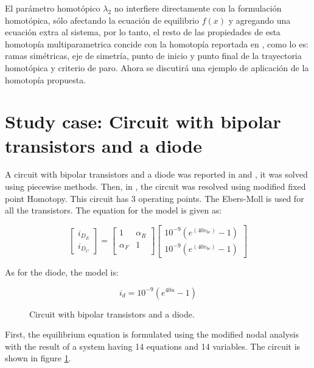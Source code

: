 \documentclass[conference,letterpaper,twocolumn]{IEEEtran}
\begin{document}
El parámetro homotópico $\lambda_2$ no interfiere directamente con la formulación homotópica, sólo afectando la ecuación de equilibrio $f(x)$ y agregando una ecuación extra al sistema, por lo tanto,
el resto de las propiedades de esta homotopía multiparametrica concide con la homotopía reportada en \cite{xxx1}, como lo es: ramas simétricas, eje de simetría, punto de inicio
y punto final de la trayectoria homotópica y criterio de paro. Ahora se discutirá una ejemplo de aplicación de la homotopía propuesta.


\section{Study case: Circuit with bipolar transistors and a diode}


A circuit with bipolar transistors and a diode was reported in \cite{homo_tadeusiewicz} and  \cite{homo_yamamurawise}, it was solved using piecewise methods. Then, in \cite{homo_yamamura}, the circuit was resolved using modified fixed point Homotopy. This circuit has 3 operating points. The Ebers-Moll is used for all the transistors. The equation for the model is given as:

\begin{displaymath}
\left[ \begin{array}{c}
i_{D_E} \\
i_{D_C}
\end{array}\right] =
\left[ \begin{array}{cc} 1  & \alpha_R \\
\alpha_F & 1 \\
\end{array}\right] \left[ \begin{array}{c}
10^{-9}(e^{(40v_{be})} - 1) \\
10^{-9}(e^{(40v_{bc})} - 1)
\end{array}\right]
\end{displaymath}

As for the diode, the model is:

\begin{displaymath}
i_d=10^{-9}(e^{40u} - 1)
\end{displaymath}

\begin{figure}[hbtp]
\centerline{
\epsfxsize=75mm
}
\caption{Circuit with bipolar transistors and a diode.}
\label{yamamuracircuito}
\end{figure}

First, the equilibrium equation is formulated using the modified nodal analysis with the result of a system having 14 equations and 14 variables. The circuit is shown in figure \ref{yamamuracircuito}.
\end{document}

